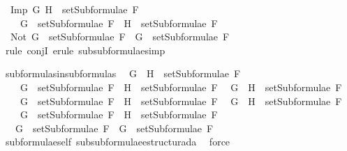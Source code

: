 \begin{isabellebody}
\ \ {\isachardoublequoteopen}Imp\ G\ H\ {\isasymin}\ setSubformulae\ F\ \isanewline
\ \ \ {\isasymLongrightarrow}\ G\ {\isasymin}\ setSubformulae\ F\ {\isasymand}\ H\ {\isasymin}\ setSubformulae\ F{\isachardoublequoteclose}\isanewline
\ \ {\isachardoublequoteopen}Not\ G\ {\isasymin}\ setSubformulae\ F\ {\isasymLongrightarrow}\ G\ {\isasymin}\ setSubformulae\ F{\isachardoublequoteclose}\isanewline
%
\isadelimproof
\ \ %
\endisadelimproof
%
\isatagproof
{}\isamarkupfalse%
\ {\isacharparenleft}{\isacharparenleft}rule\ conjI{\isacharparenright}{\isacharplus}{\isacharcomma}\ {\isacharparenleft}erule\ subsubformulae{\isacharcomma}simp{\isacharparenright}{\isacharplus}{\isacharparenright}{\isacharplus}\isanewline
\ \ \isamarkupfalse%
%
\endisatagproof
{\isafoldproof}%
%
\isadelimproof
%
\endisadelimproof
%
\begin{isamarkuptext}%
%
\end{isamarkuptext}\isamarkuptrue%
\isamarkupfalse%
\ subformulas{\isacharunderscore}in{\isacharunderscore}subformulas{\isacharcolon}\isanewline
\ \ {\isachardoublequoteopen}G\ \isactrlbold {\isasymand}\ H\ {\isasymin}\ setSubformulae\ F\ \isanewline
\ \ \ {\isasymLongrightarrow}\ G\ {\isasymin}\ setSubformulae\ F\ {\isasymand}\ H\ {\isasymin}\ setSubformulae\ F{\isachardoublequoteclose}\isanewline
\ \ {\isachardoublequoteopen}G\ \isactrlbold {\isasymor}\ H\ {\isasymin}\ setSubformulae\ F\ \isanewline
\ \ \ {\isasymLongrightarrow}\ G\ {\isasymin}\ setSubformulae\ F\ {\isasymand}\ H\ {\isasymin}\ setSubformulae\ F{\isachardoublequoteclose}\isanewline
\ \ {\isachardoublequoteopen}G\ \isactrlbold {\isasymrightarrow}\ H\ {\isasymin}\ setSubformulae\ F\ \isanewline
\ \ \ {\isasymLongrightarrow}\ G\ {\isasymin}\ setSubformulae\ F\ {\isasymand}\ H\ {\isasymin}\ setSubformulae\ F{\isachardoublequoteclose}\isanewline
\ \ {\isachardoublequoteopen}\isactrlbold {\isasymnot}\ G\ {\isasymin}\ setSubformulae\ F\ {\isasymLongrightarrow}\ G\ {\isasymin}\ setSubformulae\ F{\isachardoublequoteclose}\isanewline
%
\isadelimproof
\ \ %
\endisadelimproof
%
\isatagproof
{}\isamarkupfalse%
\ subformulae{\isacharunderscore}self\ subsubformulae{\isacharunderscore}estructurada\ \isamarkupfalse%
\ force\isanewline
\ \ \isamarkupfalse%
%
\endisatagproof
{\isafoldproof}%
%
\isadelimproof
%
\endisadelimproof
%
\begin{isamarkuptext}%
%
\end{isamarkuptext}\isamarkuptrue%

\end{isabellebody}
